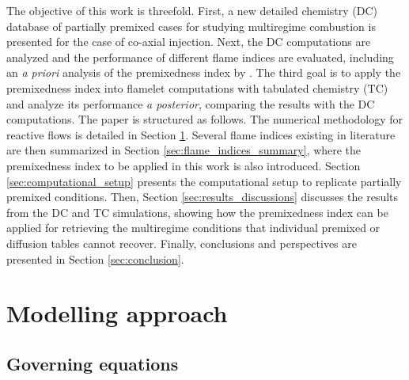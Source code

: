 \documentclass[preprint,12pt,authoryear]{elsarticle}
\begin{document}

The objective of this work is threefold. First, a new detailed chemistry (DC) database of partially premixed cases for studying multiregime combustion is presented for the case of co-axial injection. Next, the DC computations are analyzed and the performance of different flame indices are evaluated, including an  
\textsl{a priori} analysis of the premixedness index by \cite{illana_extended_2021}. The third goal is to apply the premixedness index into flamelet computations with tabulated chemistry (TC) and analyze its performance \textsl{a posterior}, comparing the results with the DC computations. The paper is structured as follows. The numerical methodology for reactive flows is detailed in Section \ref{sec:modelling_approach}. Several flame indices existing in literature are then summarized in Section \ref{sec:flame_indices_summary}, where the premixedness index to be applied in this work is also introduced. Section \ref{sec:computational_setup} presents the computational setup to replicate partially premixed conditions. Then, Section \ref{sec:results_discussions} discusses the results from the DC and TC simulations, showing how the premixedness index can be applied for retrieving the multiregime conditions that individual premixed or diffusion tables cannot recover. Finally, conclusions and perspectives are presented in Section \ref{sec:conclusion}.






\section{Modelling approach}
\label{sec:modelling_approach}


\subsection{Governing equations}
\label{sec:governing_equations}
\end{document}
